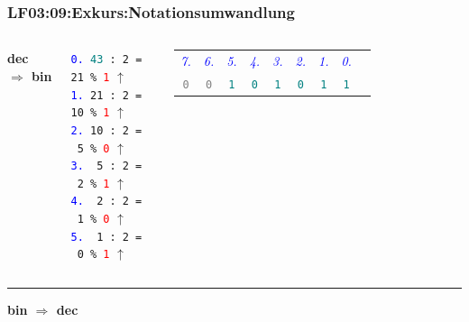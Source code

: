 \begin{frame}[fragile]  
  \frametitle{LF03:09:Exkurs:Notationsumwandlung}
  \begin{footnotesize}
  \begin{columns}
    \textbf{dec $\Rightarrow$ bin}
  
    \vspace{0.2cm}
    \texttt{\textcolor{blue}{\tiny{0.}} \textcolor{teal}{43} : 2 = 21 \% \textcolor{red}{1}} $\uparrow$\\
    \texttt{\textcolor{blue}{\tiny{1.}} 21 : 2 = 10 \% \textcolor{red}{1}} $\uparrow$\\
    \texttt{\textcolor{blue}{\tiny{2.}} 10 : 2 = \ 5 \% \textcolor{red}{0}} $\uparrow$\\
    \texttt{\textcolor{blue}{\tiny{3.}} \ 5 : 2 = \ 2 \% \textcolor{red}{1}} $\uparrow$\\
    \texttt{\textcolor{blue}{\tiny{4.}} \ 2 : 2 = \ 1 \% \textcolor{red}{0}} $\uparrow$\\
    \texttt{\textcolor{blue}{\tiny{5.}} \ 1 : 2 = \ 0 \% \textcolor{red}{1}} $\uparrow$ \\

    
    \renewcommand{\arraystretch}{1.5}
    \begin{tabular}{c c c c c c c c c}
    \textit{\textcolor{blue}{7.}} &\textit{\textcolor{blue}{6.}} &
      \textit{\textcolor{blue}{5.}} & \textit{\textcolor{blue}{4.}} &
        \textit{\textcolor{blue}{3.}} & \textit{\textcolor{blue}{2.}} &
          \textit{\textcolor{blue}{1.}} & \textit{\textcolor{blue}{0.}} & \\
      \texttt{\textcolor{gray}{0}} & \texttt{\textcolor{gray}{0}} & \texttt{\textcolor{teal}{1}} & \texttt{\textcolor{teal}{0}} & 
        \texttt{\textcolor{teal}{1}} & \texttt{\textcolor{teal}{0}} & \texttt{\textcolor{teal}{1}} & \texttt{\textcolor{teal}{1}} & \\
   \end{tabular}
  \end{columns}

  \vspace{0.6cm}
  \rule{0.9\textwidth}{0.5pt}
  
  \vspace{0.6cm}

  \textbf{bin $\Rightarrow$ dec}
  
  \vspace{0.2cm}


\end{footnotesize}
\end{frame}
